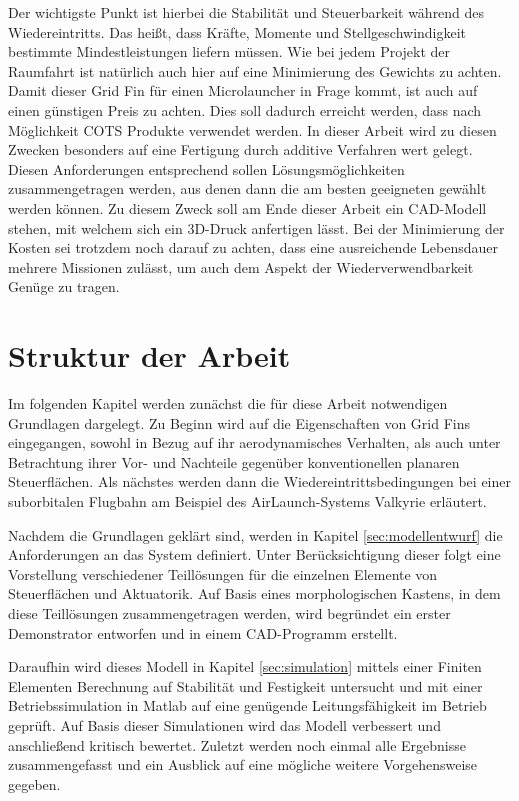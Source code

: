 Der wichtigste Punkt ist hierbei die Stabilität und Steuerbarkeit während des Wiedereintritts. Das heißt, dass Kräfte, Momente und Stellgeschwindigkeit bestimmte Mindestleistungen liefern müssen. Wie bei jedem Projekt der Raumfahrt ist natürlich auch hier auf eine Minimierung des Gewichts zu achten. Damit dieser Grid Fin für einen Microlauncher in Frage kommt, ist auch auf einen günstigen Preis zu achten. Dies soll dadurch erreicht werden, dass nach Möglichkeit \gls{COTS} Produkte verwendet werden. In dieser Arbeit wird zu diesen Zwecken besonders auf eine Fertigung durch additive Verfahren wert gelegt.
Diesen Anforderungen entsprechend sollen Lösungsmöglichkeiten zusammengetragen werden, aus denen dann die am besten geeigneten gewählt werden können. Zu diesem Zweck soll am Ende dieser Arbeit ein CAD-Modell stehen, mit welchem sich ein 3D-Druck anfertigen lässt. Bei der Minimierung der Kosten sei trotzdem noch darauf zu achten, dass eine ausreichende Lebensdauer mehrere Missionen zulässt, um auch dem Aspekt der Wiederverwendbarkeit Genüge zu tragen.

\section{Struktur der Arbeit}
Im folgenden Kapitel werden zunächst die für diese Arbeit notwendigen Grundlagen dargelegt. Zu Beginn wird auf die Eigenschaften von Grid Fins eingegangen, sowohl in Bezug auf ihr aerodynamisches Verhalten, als auch unter Betrachtung ihrer Vor- und Nachteile gegenüber konventionellen planaren Steuerflächen. Als nächstes werden dann die Wiedereintrittsbedingungen bei einer suborbitalen Flugbahn am Beispiel des AirLaunch-Systems Valkyrie erläutert.

Nachdem die Grundlagen geklärt sind, werden in Kapitel \ref{sec:modellentwurf} die Anforderungen an das System definiert. Unter Berücksichtigung dieser folgt eine Vorstellung verschiedener Teillösungen für die einzelnen Elemente von Steuerflächen und Aktuatorik. Auf Basis eines morphologischen Kastens, in dem diese Teillösungen zusammengetragen werden, wird begründet ein erster Demonstrator entworfen und in einem CAD-Programm erstellt.

Daraufhin wird dieses Modell in Kapitel \ref{sec:simulation} mittels einer Finiten Elementen Berechnung auf Stabilität und Festigkeit untersucht und mit einer Betriebssimulation in Matlab auf eine genügende
Leitungsfähigkeit im Betrieb geprüft. Auf Basis dieser Simulationen wird das Modell verbessert und anschließend kritisch bewertet.
Zuletzt werden noch einmal alle Ergebnisse zusammengefasst und ein Ausblick auf eine mögliche weitere Vorgehensweise gegeben.